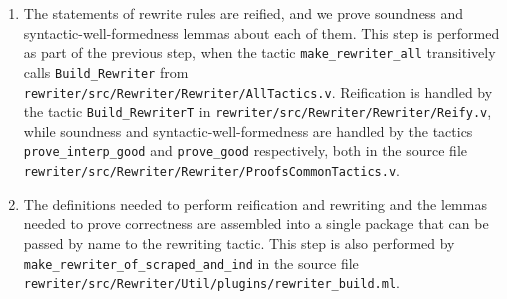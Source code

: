 \begin{subappendices}
\begin{enumerate}
  \item
    The statements of rewrite rules are reified, and we prove soundness and syntactic-well-formedness lemmas about each of them.
    This step is performed as part of the previous step, when the tactic \texttt{make\_rewriter\_all} transitively calls \texttt{Build\_Rewriter} from \texttt{rewriter/src/Rewriter/Rewriter/AllTactics.v}.
    Reification is handled by the tactic \texttt{Build\_RewriterT} in \texttt{rewriter/src/Rewriter/Rewriter/Reify.v}, while soundness and syntactic-well-formedness are handled by the tactics \texttt{prove\_interp\_good} and \texttt{prove\_good} respectively, both in the source file \texttt{rewriter/src/Rewriter/Rewriter/ProofsCommonTactics.v}.
  \item
    The definitions needed to perform reification and rewriting and the lemmas needed to prove correctness are assembled into a single package that can be passed by name to the rewriting tactic.
    This step is also performed by \texttt{make\_rewriter\_of\_scraped\_and\_ind} in the source file \texttt{rewriter/src/Rewriter/Util/plugins/rewriter\_build.ml}.
\end{enumerate}


\end{subappendices}
